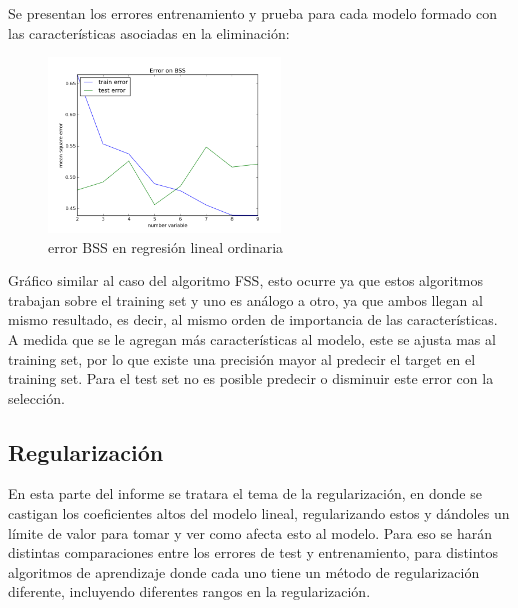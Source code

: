 \documentclass[10pt]{article}
\begin{document}
\begin{itemize}
Se presentan los errores entrenamiento y prueba para cada modelo formado con las características asociadas en la eliminación:

\begin{figure}[!htb]
    \centering
    \includegraphics[width=0.55\textwidth]{images/bss}
    \caption{error BSS en regresión lineal ordinaria}
    \label{fig:mesh1}
\end{figure}

Gráfico similar al caso del algoritmo FSS, esto ocurre ya que estos algoritmos trabajan sobre el training set y uno es análogo a otro, ya que ambos llegan al mismo resultado, es decir, al mismo orden de importancia de las características. \\
A medida que se le agregan más características al modelo, este se ajusta mas al training set, por lo que existe una precisión mayor al predecir el target en el training set. Para el test set no es posible predecir o disminuir este error con la selección.\\
\end{itemize}

\subsection{Regularización}

En esta parte del informe se tratara el tema de la regularización, en donde se castigan los coeficientes altos del modelo lineal, regularizando estos y dándoles un límite de valor para tomar y ver como afecta esto al modelo. Para eso se harán distintas comparaciones entre los errores de test y entrenamiento, para distintos algoritmos de aprendizaje donde cada uno tiene un método de regularización diferente, incluyendo diferentes rangos en la regularización.
 
\end{document}
